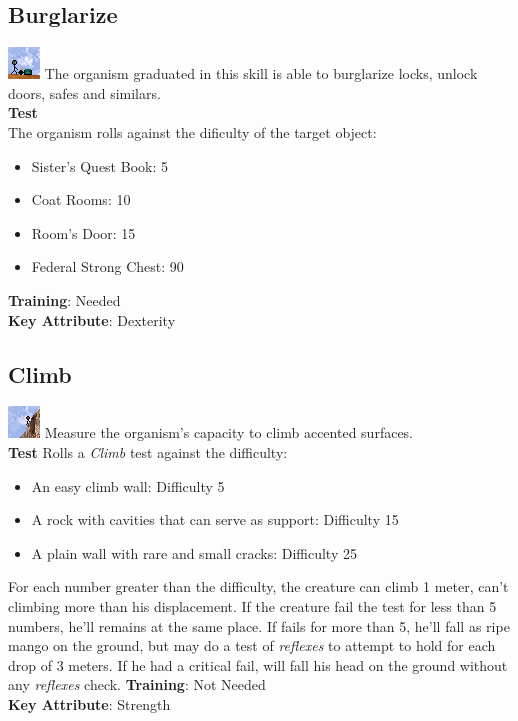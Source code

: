 \documentclass[ letterpaper,12pt]{article}
\begin{document}
\subsection{Burglarize}
\includegraphics{../data/skills/Img/arrombar.png}
The organism graduated in this skill is able to burglarize locks, unlock doors, safes and similars.\\
{\bf Test}\\
The organism rolls against the dificulty of the target object:\\
\begin{itemize}
\item{Sister's Quest Book: 5}
\item{Coat Rooms: 10}
\item{Room's Door: 15}
\item{Federal Strong Chest: 90}
\end{itemize}
{\bf Training}: Needed\\
{\bf Key Attribute}: Dexterity\\

\subsection{Climb}
\includegraphics{../data/skills/Img/escalar.png}
Measure the organism's capacity to climb accented surfaces.\\
{\bf Test}
Rolls a {\it Climb} test against the difficulty:\\
\begin{itemize}
\item{An easy climb wall: Difficulty 5}
\item{A rock with cavities that can serve as support: Difficulty 15}
\item{A plain wall with rare and small cracks: Difficulty 25}
\end{itemize}
For each number greater than the difficulty, the creature can climb 1 meter, can't climbing more than his displacement. If the creature fail the test for less than 5 numbers, he'll remains at the same place. If fails for more than 5, he'll fall as ripe mango on the ground, but may do a test of {\it reflexes} to attempt to hold for each drop of 3 meters. If he had a critical fail, will fall his head on the ground without any {\it reflexes} check.
{\bf Training}: Not Needed\\
{\bf Key Attribute}: Strength\\
\end{document}
